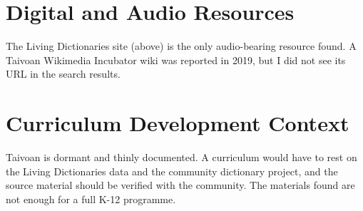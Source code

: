 \documentclass[12pt]{article}
\begin{document}
\section{Digital and Audio Resources}
The Living Dictionaries site (above) is the only audio-bearing resource found. A Taivoan Wikimedia Incubator wiki was reported in 2019, but I did not see its URL in the search results.

\section{Curriculum Development Context}
Taivoan is dormant and thinly documented. A curriculum would have to rest on the Living Dictionaries data and the community dictionary project, and the source material should be verified with the community. The materials found are not enough for a full K-12 programme.
\end{document}

